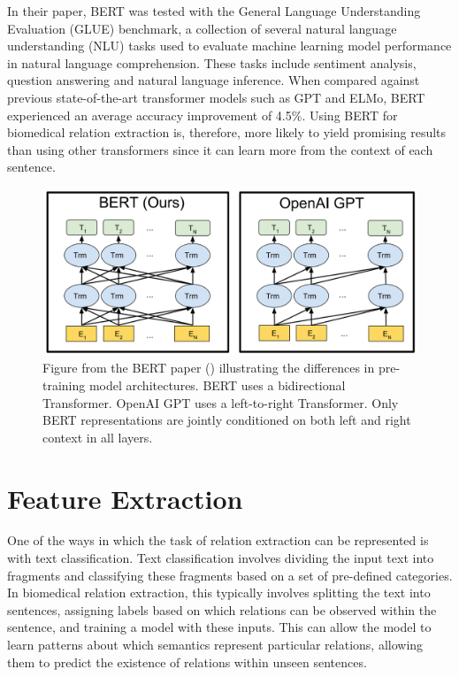\documentclass{l4proj}
\begin{document}
In their paper, BERT was tested with the General Language Understanding Evaluation (GLUE) benchmark, a collection of several natural language understanding (NLU) tasks used to evaluate machine learning model performance in natural language comprehension. These tasks include sentiment analysis, question answering and natural language inference. When compared against previous state-of-the-art transformer models such as GPT and ELMo, BERT experienced an average accuracy improvement of 4.5\%. Using BERT for biomedical relation extraction is, therefore, more likely to yield promising results than using other transformers since it can learn more from the context of each sentence.

\begin{figure}[!htb]
    \centering
    \includegraphics[width=14cm]{images/BERTvsGPT.png}
  \caption{Figure from the BERT paper (\cite{BERT}) illustrating the differences in pre-training model architectures. BERT uses a bidirectional Transformer. OpenAI GPT uses a left-to-right Transformer. Only BERT representations are jointly conditioned on both left and right context in all layers.}
  \label{fig:BERTvsGPT}
\end{figure}

\newpage
\section{Feature Extraction}
One of the ways in which the task of relation extraction can be represented is with text classification. Text classification involves dividing the input text into fragments and classifying these fragments based on a set of pre-defined categories. In biomedical relation extraction, this typically involves splitting the text into sentences, assigning labels based on which relations can be observed within the sentence, and training a model with these inputs. This can allow the model to learn patterns about which semantics represent particular relations, allowing them to predict the existence of relations within unseen sentences.
\end{document}
